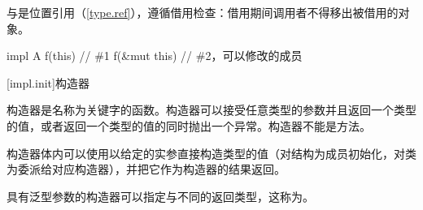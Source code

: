 \pnum
{}与是位置引用（\ref{type.ref}），遵循借用检查：借用期间调用者不得移出被借用的对象。

\enterexample
\begin{codeblock}
impl A {
    f(this) { } // \#1
    f(&mut this) { } // \#2，可以修改的成员
}

\end{codeblock}
\exitexample

[impl.init]{构造器}

\pnum
构造器是名称为关键字的函数。构造器可以接受任意类型的参数并且返回一个类型的值，或者返回一个类型的值的同时抛出一个异常。构造器不能是方法。

\pnum
构造器体内可以使用以给定的实参直接构造类型的值（对结构为成员初始化，对类为委派给对应构造器），并把它作为构造器的结果返回。

\pnum
具有泛型参数的构造器可以指定与不同的返回类型，这称为。

